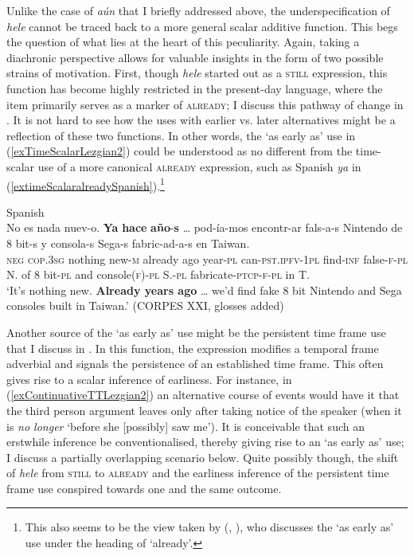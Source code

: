 Unlike the case of  \textit{aún} that I briefly addressed above, the underspecification of \textit{hele} cannot be traced back to a more general scalar additive function. This begs the question of what lies at the heart of this peculiarity. Again, taking a diachronic perspective allows for valuable insights in the form of two possible strains of motivation. First, though \textit{hele} started out as a \textsc{still} expression, this function has become highly restricted in the present-day language, where the item primarily serves as a marker of \textsc{already}; I discuss this pathway of change in . It is not hard to see how the uses with earlier vs. later alternatives might be a reflection of these two functions. In other words, the \lq as early as\rq{ }use in (\ref{exTimeScalarLezgian2}) could be understood as no different from the time-scalar use of a more canonical  \textsc{already} expression, such as Spanish \textit{ya} in (\ref{extimeScalaralreadySpanish}).\footnote{This also seems to be the view taken by \citeauthor{Haspelmath1991} (\citeyear{Haspelmath1991}, \citeyear{Haspelmath1993}), who discusses the \lq as early as\rq{ }use{ }under the heading of \lq already\rq{}.}

\begin{exe}
	\ex Spanish\label{extimeScalaralreadySpanish}\\
	\gll No es nada nuev-o. \textbf{Ya} \textbf{hace} \textbf{año}-\textbf{s} … pod-ía-mos encontr-ar fals-a-s Nintendo de 8 bit-s y consola-s Sega-s fabric-ad-a-s en Taiwan.\\
	\textsc{neg} \textsc{cop}.3\textsc{sg} nothing new-\textsc{m} already ago year-\textsc{pl} {} can-\textsc{pst}.\textsc{ipfv}-1\textsc{pl} find-\textsc{inf} false-\textsc{f}-\textsc{pl} N. of 8 bit-\textsc{pl} and console(\textsc{f})-\textsc{pl} S.-\textsc{pl} fabricate-\textsc{ptcp}-\textsc{f}-\textsc{pl} in T.\\
	\glt \lq It's nothing new. \textbf{Already years ago} … we'd find fake 8 bit Nintendo and Sega consoles built in Taiwan.\rq{ }(CORPES XXI, glosses added)
\end{exe}

Another source of the \lq as early as\rq{ }use might be the persistent time frame use that I discuss in . In this function, the expression modifies a temporal frame adverbial and signals the persistence of an established time frame. This often gives rise to a scalar inference of earliness. For instance, in (\ref{exContinuativeTTLezgian2}) an alternative course of events would have it that the third person argument leaves only after taking notice of the speaker (when it is \textit{no longer} \lq before she [possibly] saw me\rq{}). It is conceivable that such an erstwhile inference be conventionalised, thereby giving rise to an \lq as early as\rq{ }use; I discuss  a partially overlapping scenario below. Quite possibly though, the shift of \textit{hele} from \textsc{still} to \textsc{already} and the earliness inference of the persistent time frame use conspired towards one and the same outcome.

